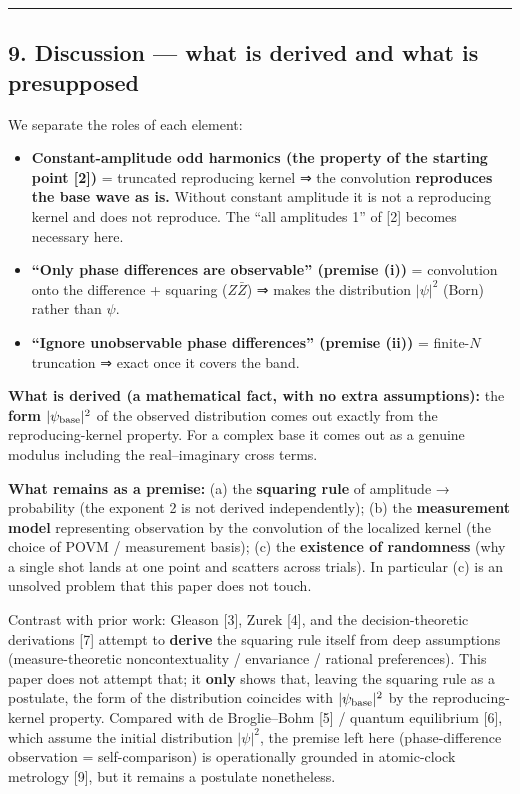 \documentclass[
]{ltjsarticle}
\newcounter{none} %
\providecommand{\tightlist}{%
  \setlength{\itemsep}{0pt}\setlength{\parskip}{0pt}}
\begin{document}
\begin{center}\rule{0.5\linewidth}{0.5pt}\end{center}

\subsection{9. Discussion --- what is derived and what is
presupposed}\label{discussion-what-is-derived-and-what-is-presupposed}

We separate the roles of each element:

\begin{itemize}
\tightlist
\item
  \textbf{Constant-amplitude odd harmonics (the property of the starting
  point {[}2{]})} = truncated reproducing kernel ⇒ the convolution
  \textbf{reproduces the base wave as is.} Without constant amplitude it
  is not a reproducing kernel and does not reproduce. The ``all
  amplitudes 1'' of {[}2{]} becomes necessary here.
\item
  \textbf{``Only phase differences are observable'' (premise (i))} =
  convolution onto the difference + squaring (\(Z\bar Z\)) ⇒ makes the
  distribution \(|\psi|^2\) (Born) rather than \(\psi\).
\item
  \textbf{``Ignore unobservable phase differences'' (premise (ii))} =
  finite-\(N\) truncation ⇒ exact once it covers the band.
\end{itemize}

\textbf{What is derived (a mathematical fact, with no extra
assumptions):} the \textbf{form} \(|\psi_{\rm base}|^2\) of the observed
distribution comes out exactly from the reproducing-kernel property. For
a complex base it comes out as a genuine modulus including the
real--imaginary cross terms.

\textbf{What remains as a premise:} (a) the \textbf{squaring rule} of
amplitude → probability (the exponent 2 is not derived independently);
(b) the \textbf{measurement model} representing observation by the
convolution of the localized kernel (the choice of POVM / measurement
basis); (c) the \textbf{existence of randomness} (why a single shot
lands at one point and scatters across trials). In particular (c) is an
unsolved problem that this paper does not touch.

Contrast with prior work: Gleason {[}3{]}, Zurek {[}4{]}, and the
decision-theoretic derivations {[}7{]} attempt to \textbf{derive} the
squaring rule itself from deep assumptions (measure-theoretic
noncontextuality / envariance / rational preferences). This paper does
not attempt that; it \textbf{only} shows that, leaving the squaring rule
as a postulate, the form of the distribution coincides with
\(|\psi_{\rm base}|^2\) by the reproducing-kernel property. Compared
with de Broglie--Bohm {[}5{]} / quantum equilibrium {[}6{]}, which
assume the initial distribution \(|\psi|^2\), the premise left here
(phase-difference observation = self-comparison) is operationally
grounded in atomic-clock metrology {[}9{]}, but it remains a postulate
nonetheless.
\end{document}
